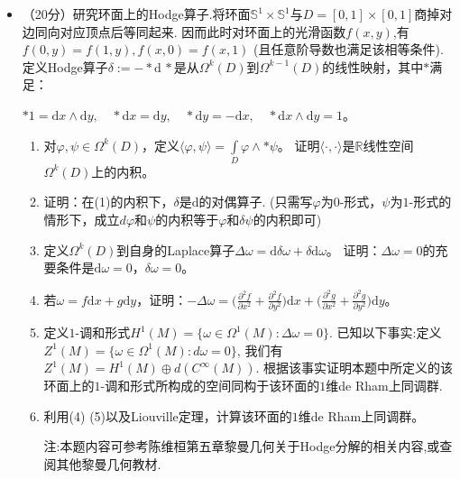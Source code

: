 \begin{itemize}
    \item[5.]
    （20分）研究环面上的Hodge算子.将环面$\mathbb{S}^1 \times \mathbb{S}^1$与$D = [0,1] \times [0,1] $商掉对边同向对应顶点后等同起来.
    因而此时对环面上的光滑函数$f(x,y)$,有$f(0,y)=f(1,y),f(x,0)=f(x,1)$ (且任意阶导数也满足该相等条件). 
    定义Hodge算子$\delta := -*\mathrm{d}\,*$是从$\Omega^k(D)$到$\Omega^{k-1}(D)$的线性映射，其中$*$满足：
    \begin{center}
        $*1 = \mathrm{d}x \wedge \mathrm{d}y, \quad *\mathrm{d}x = \mathrm{d}y, \quad *\mathrm{d}y = -\mathrm{d}x, \quad *\mathrm{d}x \wedge \mathrm{d}y = 1$。
    \end{center}
    \begin{enumerate}
        \item[(1)]
        对$\varphi , \psi \in \Omega^k(D)$，定义$\langle \varphi , \psi \rangle = \int\limits_D \varphi \wedge *\psi$。
        证明$\langle \cdot ,\cdot \rangle$是$\mathbb{R}$线性空间$\Omega^k(D)$上的内积。
        \item[(2)]
        证明：在(1)的内积下，$\delta$是$\mathrm{d}$的对偶算子. (只需写$\varphi$为$0$-形式，$\psi$为$1$-形式的情形下，成立$d\varphi$和$\psi$的内积等于$\varphi$和$\delta\psi$的内积即可)
        \item[(3)]
        定义$\Omega^k(D)$到自身的Laplace算子$\Delta\omega = \mathrm{d}\delta \omega +\delta \mathrm{d} \omega$。
        证明：$\Delta \omega =0$的充要条件是$\mathrm{d} \omega =0$，$\delta \omega =0$。
        \item[(4)]
        若$\omega=f\mathrm{d}x+g\mathrm{d}y$，证明：$-\Delta \omega = \big(\frac{\partial^2 f}{\partial x^2} + \frac{\partial^2 f}{\partial y^2}\big) \mathrm{d} x + \big(\frac{\partial^2 g}{\partial x^2} + \frac{\partial^2 g}{\partial y^2}\big) \mathrm{d} y$。
        \item[(5)]
        定义$1$-调和形式$H^1(M)=\{\omega\in\Omega^1(M):\Delta\omega=0\}$.
        已知以下事实:定义$Z^1(M)=\{\omega\in\Omega^1(M):d\omega=0\}$,
        我们有$Z^1(M)=H^1(M)\oplus d(C^\infty(M))$.
        根据该事实证明本题中所定义的该环面上的$1$-调和形式所构成的空间同构于该环面的$1$维de Rham上同调群.
        \item[(6)]
        利用(4) (5)以及Liouville定理，计算该环面的$1$维de Rham上同调群。

        注:本题内容可参考陈维桓第五章黎曼几何关于Hodge分解的相关内容,或查阅其他黎曼几何教材.
    \end{enumerate}

\end{itemize}

